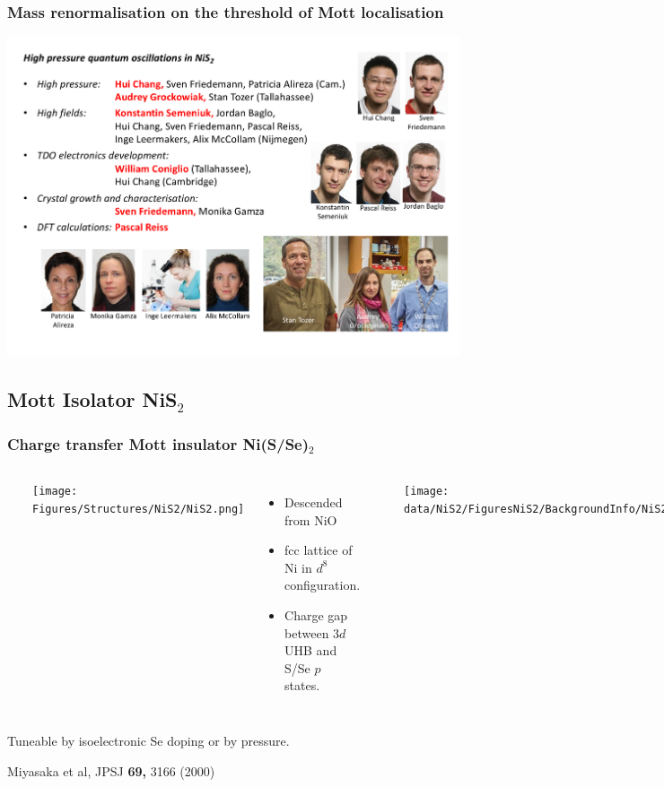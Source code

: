 


\begin{frame}[plain,label=Conc2]
\frametitle {Mass renormalisation on the threshold of Mott localisation}
\includegraphics[width=1.2\textwidth]{GroupListNiS2}
\end{frame}

\subsection{Mott Isolator NiS$_2$}
\begin{frame}[label=NiS2-1]
\frametitle{Charge transfer Mott insulator Ni(S/Se)$_2$}
\begin{columns}[t]
\centerline{~}
\centerline{\texttt{[image: \\Figures/Structures/NiS2/NiS2.png]}}

\begin{itemize}

\item
Descended from NiO
\item
fcc lattice of Ni in $d^8$ configuration.
\item
Charge gap between $3d$ UHB and S/Se $p$ states. 

\end{itemize}
\centerline{~}
\centerline{\texttt{[image: \\data/NiS2/FiguresNiS2/BackgroundInfo/NiS2MiyasakaAnn]}}
\end{columns}
\vspace{0.5em}
\centerline{Tuneable by isoelectronic Se doping or by pressure.}
\vspace*{\fill}
\vspace{-0.25em}
\centerline{\makebox[\linewidth]{\rule{0.85\textwidth}{0.4pt}}}
\centerline{\scriptsize Miyasaka et al, JPSJ {\bf 69,} 3166 (2000)}
\end{frame}






